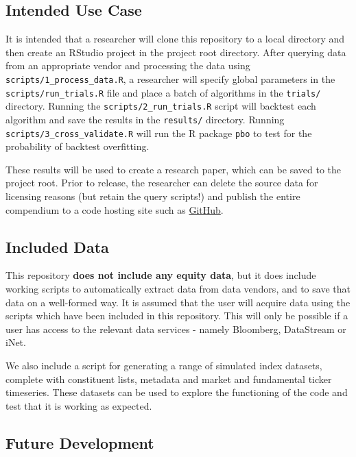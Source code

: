 \documentclass[11pt,preprint, authoryear]{elsarticle}
\numberwithin{equation}{section}
\numberwithin{figure}{section}
\numberwithin{table}{section}
\begin{document}
\subsection{Intended Use Case}\label{intended-use-case}

It is intended that a researcher will clone this repository to a local
directory and then create an RStudio project in the project root
directory. After querying data from an appropriate vendor and processing
the data using \texttt{scripts/1\_process\_data.R}, a researcher will
specify global parameters in the \texttt{scripts/run\_trials.R} file and
place a batch of algorithms in the \texttt{trials/} directory. Running
the \texttt{scripts/2\_run\_trials.R} script will backtest each
algorithm and save the results in the \texttt{results/} directory.
Running \texttt{scripts/3\_cross\_validate.R} will run the R package
\texttt{pbo} to test for the probability of backtest overfitting.

These results will be used to create a research paper, which can be
saved to the project root. Prior to release, the researcher can delete
the source data for licensing reasons (but retain the query scripts!)
and publish the entire compendium to a code hosting site such as
\href{https://github.com}{GitHub}.

\subsection{Included Data}\label{included-data}

This repository \textbf{does not include any equity data}, but it does
include working scripts to automatically extract data from data vendors,
and to save that data on a well-formed way. It is assumed that the user
will acquire data using the scripts which have been included in this
repository. This will only be possible if a user has access to the
relevant data services - namely Bloomberg, DataStream or iNet.

We also include a script for generating a range of simulated index
datasets, complete with constituent lists, metadata and market and
fundamental ticker timeseries. These datasets can be used to explore the
functioning of the code and test that it is working as expected.

\subsection{Future Development}\label{future-development}
\end{document}
